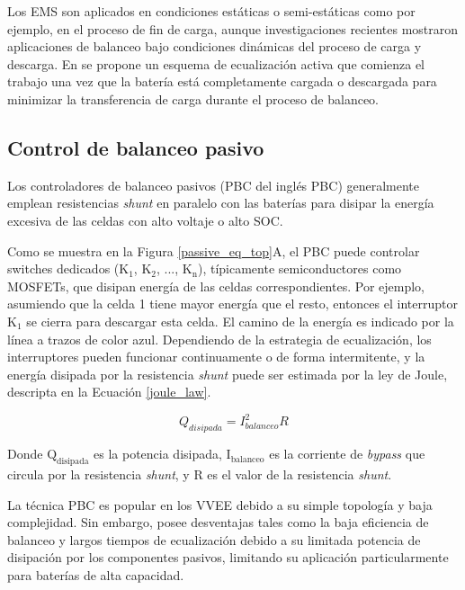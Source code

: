 Los \acrshort{EMS} son aplicados en condiciones est\'aticas o semi-est\'aticas 
como por ejemplo, en el proceso de fin de carga, aunque investigaciones 
recientes mostraron aplicaciones de balanceo bajo condiciones din\'amicas del 
proceso de carga y descarga. En \cite{shen_cell_bal} se propone un esquema de 
ecualizaci\'on activa que comienza el trabajo una vez que la bater\'ia est\'a
completamente cargada o descargada para minimizar la transferencia de carga 
durante el proceso de balanceo.

\subsection{Control de balanceo pasivo}\label{seq:balanceo_pasivo}

Los controladores de balanceo pasivos (\acrshort{PBC} del ingl\'es
\acrlong{PBC}) generalmente emplean resistencias \emph{shunt} en paralelo
con las bater\'ias para disipar la energ\'ia excesiva de las celdas con alto
voltaje o alto \acrshort{SOC}.

Como se muestra en la Figura \ref{passive_eq_top}A, el \acrshort{PBC} puede
controlar switches dedicados ($\mathrm{K_1}$, $\mathrm{K_2}$, ...,
$\mathrm{K_n}$), t\'ipicamente semiconductores como MOSFETs, que disipan
energ\'ia de las celdas correspondientes. Por ejemplo, asumiendo que la celda 1
tiene mayor energ\'ia que el resto, entonces el interruptor $\mathrm{K_1}$ se 
cierra para descargar esta celda. El camino de la energ\'ia es indicado por la 
línea a trazos de color azul. Dependiendo de la estrategia de ecualizaci\'on, 
los interruptores pueden funcionar continuamente o de forma intermitente, y la
energ\'ia disipada por la resistencia \emph{shunt} puede ser estimada por la
ley de Joule, descripta en la Ecuaci\'on \ref{joule_law}.

\begin{equation}
    Q_{disipada} = I^2_{balanceo}R \label{joule_law}
\end{equation}

Donde $\mathrm{Q_{disipada}}$ es la potencia disipada, $\mathrm{I_{balanceo}}$
es la corriente de \emph{bypass} que circula por la resistencia \emph{shunt}, y
R es el valor de la resistencia \emph{shunt}.

La t\'ecnica \acrshort{PBC} es popular en los \acrshort{VVEE} debido a su simple
topolog\'ia y baja complejidad. Sin embargo, posee desventajas tales como la
baja eficiencia de balanceo y largos tiempos de ecualizaci\'on debido a su
limitada potencia de disipaci\'on por los componentes pasivos, limitando su
aplicaci\'on particularmente para bater\'ias de alta capacidad.

